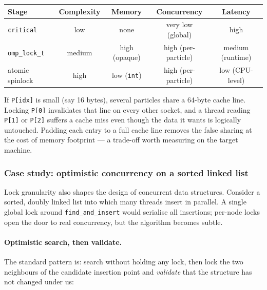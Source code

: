\begin{center}
\small
\renewcommand{\arraystretch}{1.3}
\begin{tabular}{@{} l c c c c @{}}
\toprule
\textbf{Stage} & \textbf{Complexity} & \textbf{Memory} & \textbf{Concurrency} & \textbf{Latency} \\
\midrule
\texttt{critical}        & low    & none              & very low (global)    & high \\
\texttt{omp\_lock\_t}    & medium & high (opaque)     & high (per-particle)  & medium (runtime) \\
atomic spinlock          & high   & low (\texttt{int})& high (per-particle)  & low (CPU-level) \\
\bottomrule
\end{tabular}
\end{center}

\begin{observationblock}
If \texttt{P[idx]} is small (say 16 bytes), several particles share a 64-byte cache line. Locking \texttt{P[0]} invalidates that line on every other socket, and a thread reading \texttt{P[1]} or \texttt{P[2]} suffers a cache miss even though the data it wants is logically untouched. Padding each entry to a full cache line removes the false sharing at the cost of memory footprint --- a trade-off worth measuring on the target machine.
\end{observationblock}

\subsubsection{Case study: optimistic concurrency on a sorted linked list}

Lock granularity also shapes the design of concurrent data structures. Consider a sorted, doubly linked list into which many threads insert in parallel. A single global lock around \texttt{find\_and\_insert} would serialise all insertions; per-node locks open the door to real concurrency, but the algorithm becomes subtle.

\paragraph{Optimistic search, then validate.} The standard pattern is: search without holding any lock, then lock the two neighbours of the candidate insertion point and \emph{validate} that the structure has not changed under us:

